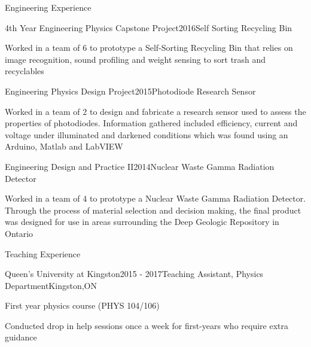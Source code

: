 \documentclass{resume2} %
\begin{document}
\begin{rSection}{Engineering Experience}
	
	\begin{rSubsection}{4th Year Engineering Physics Capstone Project}{2016}{Self Sorting Recycling Bin}{}
		\item Worked in a team of 6 to prototype a Self-Sorting Recycling Bin that relies on image recognition, sound profiling and weight sensing to sort trash and recyclables
	\end{rSubsection}

	\begin{rSubsection}{Engineering Physics Design Project}{2015}{Photodiode Research Sensor}{}
		\item Worked in a team of 2 to design and fabricate a research sensor used to assess the properties of photodiodes. Information gathered included efficiency, current and voltage under illuminated and darkened conditions which was found using an Arduino, Matlab and LabVIEW
	\end{rSubsection}

	\begin{rSubsection}{Engineering Design and Practice II}{2014}{Nuclear Waste Gamma Radiation Detector}{}
		\item Worked in a team of 4 to prototype a Nuclear Waste Gamma Radiation Detector. Through the process of material selection and decision making, the final product was designed for use in areas surrounding the Deep Geologic Repository in Ontario
	\end{rSubsection}
	
\end{rSection}


\begin{rSection}{Teaching Experience}
	
	\begin{rSubsection}{Queen's University at Kingston}{2015 - 2017}{Teaching Assistant, Physics Department}{Kingston,ON}
		\item First year physics course (PHYS 104/106)
		\item Conducted drop in help sessions once a week for first-years who require extra guidance
	\end{rSubsection}

\end{rSection}
\end{document}
